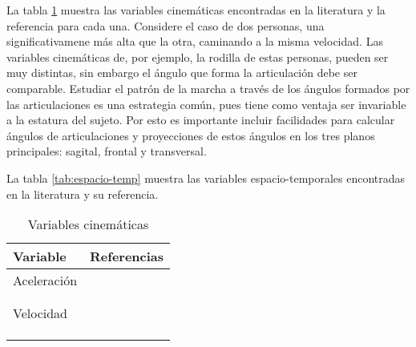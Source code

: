 La tabla \ref{tab:cinematicas} muestra las variables cinemáticas encontradas en la literatura y la referencia para cada una. Considere el caso de dos personas, una significativamene más alta que la otra, caminando a la misma velocidad. Las variables cinemáticas de, por ejemplo, la rodilla de estas personas, pueden ser muy distintas, sin embargo el ángulo que forma la articulación debe ser comparable. Estudiar el patrón de la marcha a través de los ángulos formados por las articulaciones es una estrategia común, pues tiene como ventaja ser invariable a la estatura del sujeto. Por esto es importante incluir facilidades para calcular ángulos de articulaciones y proyecciones de estos ángulos en los tres planos principales: sagital, frontal y transversal.

La tabla \ref{tab:espacio-temp} muestra las variables espacio-temporales encontradas en la literatura y su referencia.

\begin{table}
    \centering
    \caption{Variables cinemáticas}
    \label{tab:cinematicas}
    \begin{tabular}{ll}
        \toprule
        Variable & Referencias \\
        \midrule
        Aceleración & \cite{yang, menz, dejnabadi} \\
                    & \cite{arif, senanayake, latt} \\
                    & \cite{punt, mazza}      \\
        Velocidad   & \cite{yang, menz, cuaya} \\
                    & \cite{franklin, forneris, muro} \\
                    & \cite{lei, prakash, latt} \\
                    & \cite{punt, mazza, bruijn} \\
        \bottomrule
    \end{tabular}
\end{table}

